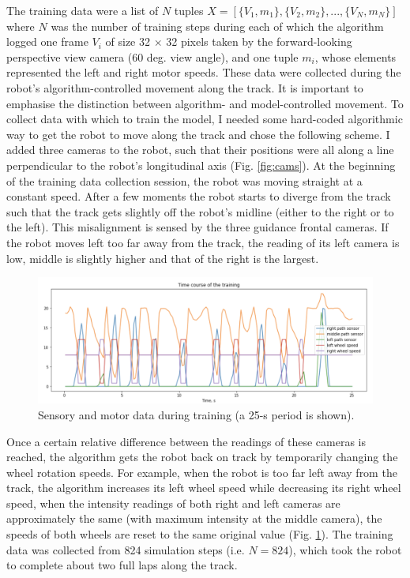 \documentclass[11pt, oneside]{article}   	%
\begin{document}
The training data were a list of $N$ tuples $X = [\{V_1, m_1\}, \{V_2, m_2\}, ..., \{V_N, m_N\}]$ \\where $N$ was the number of training steps during each of which the algorithm logged one frame $V_i$ of size 32 $\times$ 32 pixels taken by the forward-looking perspective view camera (60 deg. view angle), and one tuple $m_i$, whose elements represented the left and right motor speeds. These data were collected during the robot's algorithm-control\-led movement along the track. It is important to emphasise the distinction between algorithm- and model-controlled movement. To collect data with which to train the mo\-del, I needed some hard-coded algorithmic way to get the robot to move along the track and chose the following scheme. I added three cameras to the robot, such that their positions were all along a line perpendicular to the robot's longitudinal axis (Fig. \ref{fig:cams}). At the beginning of the training data collection session, the robot was moving straight at a constant speed. After a few moments the robot starts to diverge from the track such that the track gets slightly off the robot's midline (either to the right or to the left). This misalignment is sensed by the three guidance frontal cameras. If the robot moves left too far away from the track, the reading of its left camera is low, middle is slightly higher and that of the right is the largest. 
\begin{figure}[h]
\includegraphics[width=\columnwidth]{Fig_3} 
\caption{Sensory and motor data during training (a 25-s period is shown).}
\label{fig:training}
\end{figure}
Once a certain relative difference between the readings of these cameras is reached, the algorithm gets the robot back on track by temporarily changing the wheel rotation speeds. For example, when the robot is too far left away from the track, the algorithm increases its left wheel speed while decreasing its right wheel speed, when the intensity readings of both right and left cameras are approximately the same (with maximum intensity at the middle camera), the speeds of both wheels are reset to the same original value (Fig. \ref{fig:training}).
The training data was collected from 824 simulation steps (i.e. $N = 824$), which took the robot to complete about two full laps along the track.
\end{document}
